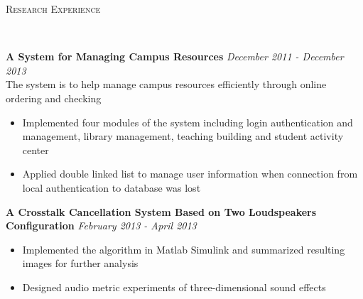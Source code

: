 \documentclass[3pt]{article}
\newenvironment{changemargin}[2]{%
  \begin{list}{}{%
    \setlength{\topsep}{0pt}%
    \setlength{\leftmargin}{#1}%
    \setlength{\rightmargin}{#2}%
    \setlength{\listparindent}{\parindent}%
    \setlength{\itemindent}{\parindent}%
    \setlength{\parsep}{\parskip}%
  }%
  \item[]}{\end{list}
}
\newcommand{\lineover}{
	\begin{changemargin}{-0.05in}{-0.05in}
		\vspace*{-8pt}
		\hrulefill \\
		\vspace*{-2pt}
	\end{changemargin}
}
\newcommand{\header}[1]{
	\begin{changemargin}{-0.5in}{-0.5in}
		{\Large \scshape{#1}}\\
  	\lineover
	\end{changemargin}
}
\newenvironment{body} {
	\vspace*{-16pt}
	\begin{changemargin}{-0.25in}{-0.5in}
  }	
	{\end{changemargin}
}
\begin{document}
\medskip
\header{Research Experience}
\begin{body}
    \vspace{18pt}
    \textbf{A System for Managing Campus Resources}  \hfill \emph{December 2011 - December 2013}\\
    The system is to help manage campus resources efficiently through online ordering and checking
    \begin{itemize} \itemsep -0pt
    \item {Implemented four modules of the system including login authentication and management, library management, teaching building and student activity center}
    \item {Applied double linked list to manage user information when connection from local authentication to database was lost}
    \end{itemize}

    \textbf{A Crosstalk Cancellation System Based on Two Loudspeakers Configuration}  \hfill \emph{February 2013 - April 2013}\\
    
    \begin{itemize} \itemsep -0pt
    \item {Implemented the algorithm in Matlab Simulink and summarized resulting images for further analysis}
    \item {Designed audio metric experiments of three-dimensional sound effects}
    \end{itemize}	

\end{body}


\end{document}
